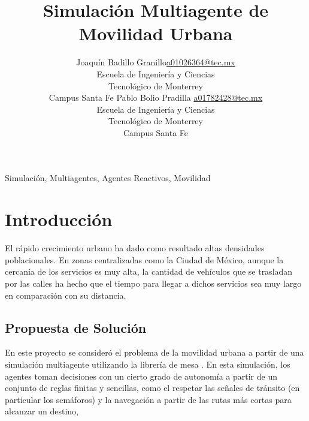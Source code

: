 \documentclass[twoside,11pt]{article}
\newcommand{\myname}{Joaquín Badillo Granillo}
\begin{document}
\renewcommand{\tablename}{Tabla}

\title{Simulación Multiagente de Movilidad Urbana}

\author{\name \myname \email \href{mailto:a01026364@tec.mx}{a01026364@tec.mx} \\
       \addr Escuela de Ingeniería y Ciencias\\
       Tecnológico de Monterrey\\
       Campus Santa Fe
       \AND
       \name Pablo Bolio Pradilla \email \href{mailto:a01782428@tec.mx}{a01782428@tec.mx} \\
       \addr Escuela de Ingeniería y Ciencias\\
       Tecnológico de Monterrey\\
       Campus Santa Fe
       }

\maketitle

\begin{abstract}
    
\end{abstract}

\begin{keywords}
  Simulación, Multiagentes, Agentes Reactivos, Movilidad
\end{keywords}

\section{Introducción}
El rápido crecimiento urbano ha dado como resultado altas densidades poblacionales.
En zonas centralizadas como la Ciudad de México, aunque la cercanía de los servicios
es muy alta, la cantidad de vehículos que se trasladan por las calles ha hecho que
el tiempo para llegar a dichos servicios sea muy largo en comparación con su distancia.

\subsection{Propuesta de Solución}
En este proyecto se consideró el problema de la movilidad urbana a partir de una simulación
multiagente utilizando la librería de mesa \cite[]{python-mesa-2020}. En esta simulación,
los agentes toman decisiones con un cierto grado de autonomía a partir de un conjunto de reglas
finitas y sencillas, como el respetar las señales de tránsito (en particular los semáforos) y 
la navegación a partir de las rutas más cortas para alcanzar un destino, 
\end{document}
